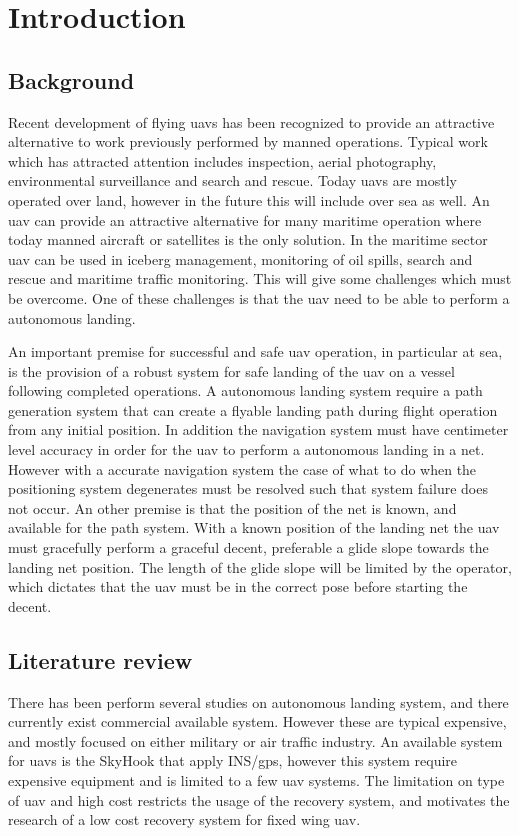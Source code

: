 \chapter{Introduction}
\section{Background}
Recent development of flying \glspl{uav} has been recognized to provide an attractive alternative to work previously performed by manned operations. Typical work which has attracted attention includes inspection, aerial photography, environmental surveillance and search and rescue. Today \glspl{uav} are mostly operated over land, however in the future this will include over sea as well. An \gls{uav} can provide an attractive alternative for many maritime operation where today manned aircraft or satellites is the only solution. In the maritime sector \gls{uav} can be used in iceberg management, monitoring of oil spills, search and rescue and maritime traffic monitoring. This will give some challenges which must be overcome. One of these challenges is that the \gls{uav} need to be able to perform a autonomous landing.

An important premise for successful and safe \gls{uav} operation, in particular at sea, is the provision of a robust system for safe landing of the \gls{uav} on a vessel following completed operations. A autonomous landing system require a path generation system that can create a flyable landing path during flight operation from any initial position. In addition the navigation system must have centimeter level accuracy in order for the \gls{uav} to perform a autonomous landing in a net. However with a accurate navigation system the case of what to do when the positioning system degenerates must be resolved such that system failure does not occur. An other premise is that the position of the net is known, and available for the path system. With a known position of the landing net the \gls{uav} must gracefully perform a graceful decent, preferable a glide slope towards the landing net position. The length of the glide slope will be limited by the operator, which dictates that the \gls{uav} must be in the correct pose before starting the decent.
\section{Literature review}
There has been perform several studies on autonomous landing system, and there currently exist commercial available system. However these are typical expensive, and mostly focused on either military or air traffic industry. An available system for \glspl{uav} is the SkyHook that apply INS/\gls{gps}\citep{SkyHook}, however this system require expensive equipment and is limited to a few \gls{uav} systems. The limitation on type of \gls{uav} and high cost restricts the usage of the recovery system, and motivates the research of a low cost recovery system for fixed wing \gls{uav}.

